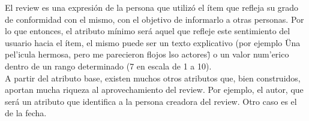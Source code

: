 El review es una expresión de la persona que utilizó el ítem que refleja su grado de conformidad con el mismo, con el objetivo de informarlo a otras personas. Por lo que entonces, el atributo mínimo será aquel que refleje este sentimiento del usuario hacia el ítem, el mismo puede ser un texto explicativo (por ejemplo \"Una pel'icula hermosa, pero me parecieron flojos lso actores\") o un valor num'erico dentro de un rango determinado (7 en escala de 1 a 10).\\
A partir del atributo base, existen muchos otros atributos que, bien construidos, aportan mucha riqueza al aprovechamiento del review. Por ejemplo, el autor, que será un atributo que identifica a la persona creadora del review. Otro caso es el de la fecha.\\